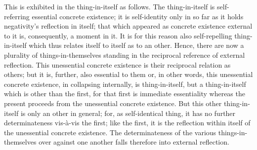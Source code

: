 This is exhibited in the thing-in-itself as follows.
The thing-in-itself is self-referring
essential concrete existence; 
it is self-identity only in so far as 
it holds negativity's reflection in itself; 
that which appeared as concrete existence 
external to it is, consequently, a moment in it.
It is for this reason also self-repelling thing-in-itself
which thus relates itself to itself as to an other. 
Hence, there are now a plurality of things-in-themselves 
standing in the reciprocal reference of external reflection. 
This unessential concrete existence is 
their reciprocal relation as others; 
but it is, further, also essential to them
or, in other words, this unessential concrete existence,
in collapsing internally, is thing-in-itself, 
but a thing-in-itself which is other than the first, 
for that first is immediate essentiality
whereas the present proceeds from the unessential concrete existence.
But this other thing-in-itself is only an other in general; 
for, as self-identical thing, it has no
further determinateness vis-à-vis the first;
like the first, it is the reflection within itself
of the unessential concrete existence.
The determinateness of the various things-in-themselves
over against one another falls therefore into external reflection.

